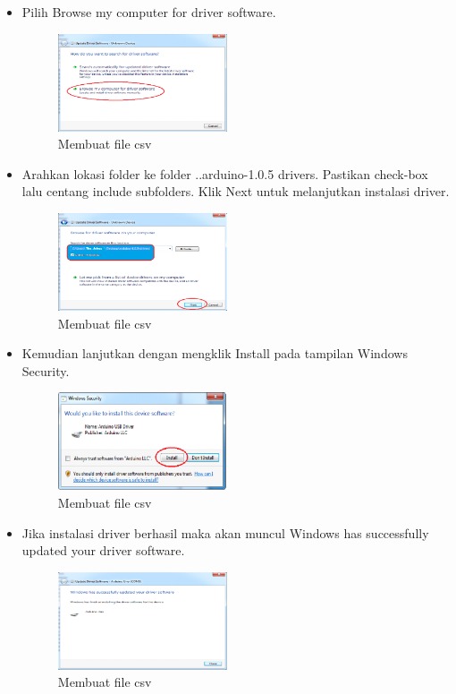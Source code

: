 \begin{enumerate}
\begin{itemize}
        \item Pilih Browse my computer for driver software.
        \begin{figure}[H]	
            \includegraphics[width=5cm]{figures/5/1174070/teori/7.png}
            \centering
            \caption{Membuat file csv}
        \end{figure}

        \item Arahkan lokasi folder ke folder ..arduino-1.0.5 drivers. Pastikan check-box lalu centang include subfolders. Klik Next untuk melanjutkan instalasi driver.
        \begin{figure}[H]	
            \includegraphics[width=5cm]{figures/5/1174070/teori/8.png}
            \centering
            \caption{Membuat file csv}
        \end{figure}

        \item Kemudian lanjutkan dengan mengklik Install pada tampilan Windows Security.
        \begin{figure}[H]	
            \includegraphics[width=5cm]{figures/5/1174070/teori/9.png}
            \centering
            \caption{Membuat file csv}
        \end{figure}

        \item Jika instalasi driver berhasil maka akan muncul Windows has successfully updated your driver software.
        \begin{figure}[H]	
            \includegraphics[width=5cm]{figures/5/1174070/teori/10.png}
            \centering
            \caption{Membuat file csv}
        \end{figure}


\end{itemize}
\end{enumerate}
